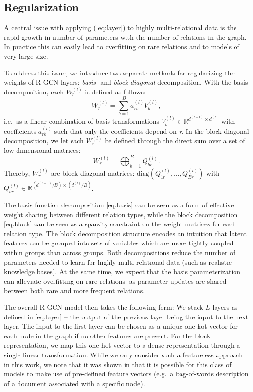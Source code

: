 \subsection{Regularization}
A central issue with applying (\ref{eq:layer}) to highly multi-relational data is the rapid growth in number of parameters with the number of relations in the graph. In practice this can easily lead to overfitting on rare relations and to models of very large size.

To address this issue, we introduce two separate methods for regularizing the weights of R-GCN-layers: \textit{basis}- and \textit{block-diagonal}-decomposition. With the basis decomposition, each $W_r^{(l)}$ is defined as follows:
\begin{equation}
\label{eq:basis}
W_r^{(l)} = \sum_{b=1}^B a_{rb}^{(l)} V_b^{(l)},
\end{equation}
i.e.~as a linear combination of basis transformations $V_b^{(l)}\in\mathbb{R}^{d^{(l+1)}\times d^{(l)}}$ with coefficients $a_{rb}^{(l)}$ such that only the coefficients depend on \textit{r}. In the block-diagonal decomposition, we let each $W_r^{(l)}$ be defined through the direct sum over a set of low-dimensional matrices:
\begin{equation}
\label{eq:block}
W_r^{(l)} = \bigoplus_{b=1}^B Q^{(l)}_{br}.
\end{equation}
Thereby, $W_r^{(l)}$ are block-diagonal matrices:
$\mathrm{diag}(Q^{(l)}_{1r}, \ldots, Q^{(l)}_{Br})$ with $Q^{(l)}_{br} \in \mathbb{R}^{(d^{(l+1)}/B)\times( d^{(l)}/B)}$.

The basis function decomposition \eqref{eq:basis} can be seen as a form of effective weight sharing between different relation types, while the block decomposition \eqref{eq:block} can be seen as a sparsity constraint on the weight matrices for each relation type. The block decomposition structure encodes an intuition that latent features can be grouped into sets of variables which are more tightly coupled within groups than across groups.
Both decompositions reduce the number of parameters needed to learn for highly multi-relational data (such as realistic knowledge bases). At the same time, we expect that the basis parameterization can alleviate overfitting on rare relations, as parameter updates are shared between both rare and more frequent relations.

The overall R-GCN model then takes the following form: We stack $L$ layers as defined in \eqref{eq:layer} -- the output of the previous layer being the input to the next layer. The input to the first layer can be chosen as a unique one-hot vector for each node in the graph if no other features are present. For the block representation, we map this one-hot vector to a dense representation through a single linear transformation. While we only consider such a featureless approach in this work, we note that it was shown in \citet{kipf2016semi} that it is possible for this class of models to make use of pre-defined feature vectors (e.g.~a bag-of-words description of a document associated with a specific node).
